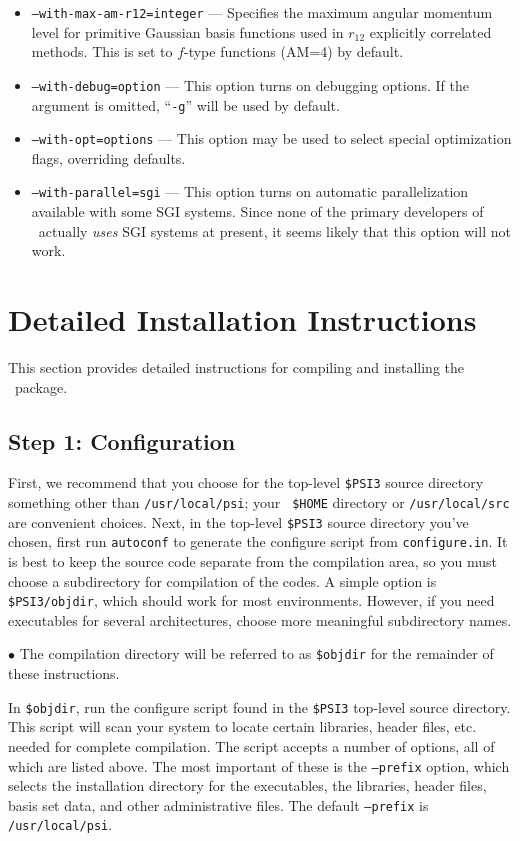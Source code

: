 \documentclass[12pt]{article}
\begin{document}
\begin{itemize}
\item {\tt --with-max-am-r12=integer} --- Specifies the maximum
  angular momentum level for primitive Gaussian basis functions used
  in $r_{12}$ explicitly correlated methods.  This is set to $f$-type
  functions (AM=4) by default.
\item {\tt --with-debug=option} --- This option turns on debugging
  options.  If the argument is omitted, ``{\tt -g}'' will be used by default.
\item {\tt --with-opt=options} --- This option may be used to select
  special optimization flags, overriding defaults.
\item {\tt --with-parallel=sgi} --- This option turns on automatic
  parallelization available with some SGI systems.  Since none of the
  primary developers of \PSIthree\ actually {\em uses} SGI systems at
  present, it seems likely that this option will not work.
\end{itemize}

\section{Detailed Installation Instructions}

This section provides detailed instructions for compiling and
installing the \PSIthree\ package.  

\subsection{Step 1: Configuration}

First, we recommend that you choose for the top-level {\tt \$PSI3}
source directory something other than {\tt /usr/local/psi}; your {\tt
\$HOME} directory or {\tt /usr/local/src} are convenient choices.  Next,
in the top-level {\tt \$PSI3} source directory you've chosen, first run
{\tt autoconf} to generate the configure script from {\tt configure.in}.
It is best to keep the source code separate from the compilation area,
so you must choose a subdirectory for compilation of the codes.  A simple
option is {\tt \$PSI3/objdir}, which should work for most environments.
However, if you need executables for several architectures, choose more
meaningful subdirectory names.

$\bullet$ The compilation directory will be referred to as {\tt \$objdir}
for the remainder of these instructions.

In {\tt \$objdir}, run the configure script found in the {\tt \$PSI3}
top-level source directory.  This script will scan your system to locate
certain libraries, header files, etc. needed for complete compilation.
The script accepts a number of options, all of which are listed above.
The most important of these is the {\tt --prefix} option, which selects the
installation directory for the executables, the libraries, header files,
basis set data, and other administrative files.  The default {\tt --prefix}
is {\tt /usr/local/psi}.
\end{document}
